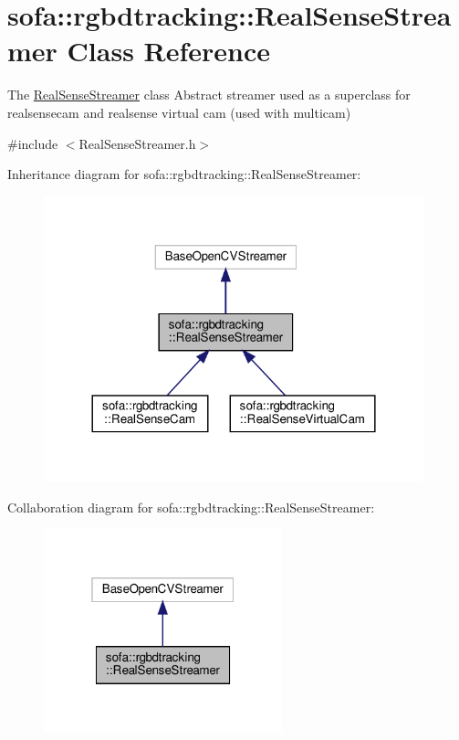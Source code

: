 \hypertarget{classsofa_1_1rgbdtracking_1_1_real_sense_streamer}{}\section{sofa\+:\+:rgbdtracking\+:\+:Real\+Sense\+Streamer Class Reference}
\label{classsofa_1_1rgbdtracking_1_1_real_sense_streamer}


The \hyperlink{classsofa_1_1rgbdtracking_1_1_real_sense_streamer}{Real\+Sense\+Streamer} class Abstract streamer used as a superclass for realsensecam and realsense virtual cam (used with multicam)  




{\ttfamily \#include $<$Real\+Sense\+Streamer.\+h$>$}



Inheritance diagram for sofa\+:\+:rgbdtracking\+:\+:Real\+Sense\+Streamer\+:
\nopagebreak
\begin{figure}[H]
\begin{center}
\leavevmode
\includegraphics[width=312pt]{classsofa_1_1rgbdtracking_1_1_real_sense_streamer__inherit__graph}
\end{center}
\end{figure}


Collaboration diagram for sofa\+:\+:rgbdtracking\+:\+:Real\+Sense\+Streamer\+:
\nopagebreak
\begin{figure}[H]
\begin{center}
\leavevmode
\includegraphics[width=196pt]{classsofa_1_1rgbdtracking_1_1_real_sense_streamer__coll__graph}
\end{center}
\end{figure}
